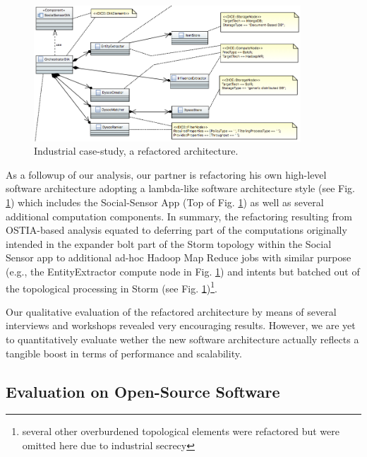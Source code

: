 
\begin{figure}
\begin{center}
\includegraphics[width=10cm]{images/atc}
		\caption{Industrial case-study, a refactored architecture.}
		\label{atc}
		\end{center}
\end{figure}

As a followup of our analysis, our partner is refactoring his own high-level software architecture adopting a lambda-like software architecture style \cite{lambda} (see Fig. \ref{atc}) which includes the Social-Sensor App (Top of Fig. \ref{atc}) as well as several additional computation components. In summary, the refactoring resulting from OSTIA-based analysis equated to deferring part of the computations originally intended in the expander bolt part of the Storm topology within the Social Sensor app to additional ad-hoc Hadoop Map Reduce jobs with similar purpose (e.g., the EntityExtractor compute node in Fig. \ref{atc}) and intents but batched out of the topological processing in Storm (see Fig. \ref{atc})\footnote{several other overburdened topological elements were refactored but were omitted here due to industrial secrecy}. 

Our qualitative evaluation of the refactored architecture by means of several interviews and workshops revealed very encouraging results. However, we are yet to quantitatively evaluate wether the new software architecture actually reflects a tangible boost in terms of performance and scalability.

\subsection{Evaluation on Open-Source Software}\label{os}

